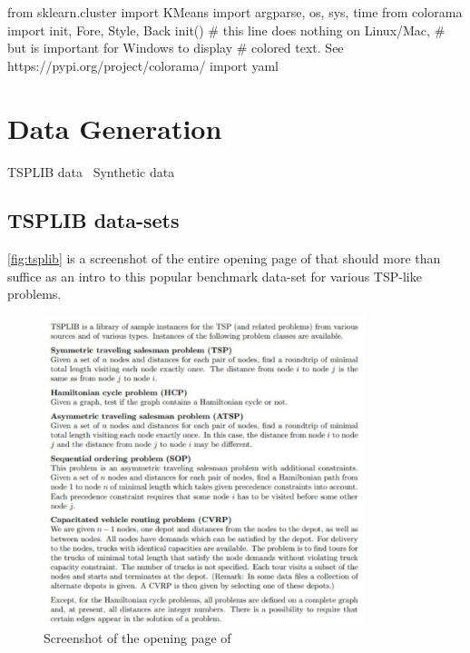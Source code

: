 from sklearn.cluster import KMeans
import argparse, os, sys, time
from colorama import init, Fore, Style, Back
init() # this line does nothing on Linux/Mac,
       # but is important for Windows to display
       # colored text. See https://pypi.org/project/colorama/
import yaml
\nwendcode{}\nwdocspar


\section{Data Generation}

\nwenddocs{}\endmoddef\nwstartdeflinemarkup{}\nwenddeflinemarkup
\LA{}TSPLIB data~{\nwtagstyle{}}\RA{}
\LA{}Synthetic data~{\nwtagstyle{}}\RA{}
\nwendcode{}\nwdocspar

\subsection{TSPLIB data-sets}

\autoref{fig:tsplib} is a screenshot of the entire opening page of \cite{reinelt1991tsplib}
that should more than suffice as an intro to this popular benchmark data-set for various TSP-like problems. 

\begin{figure}[htbp]
  \centering
  \includegraphics[width=9.4cm]{miscimages/tsplib-screenshot.pdf}
  \caption{\label{fig:tsplib} Screenshot of the opening page of \cite{reinelt1991tsplib} }
\end{figure}

